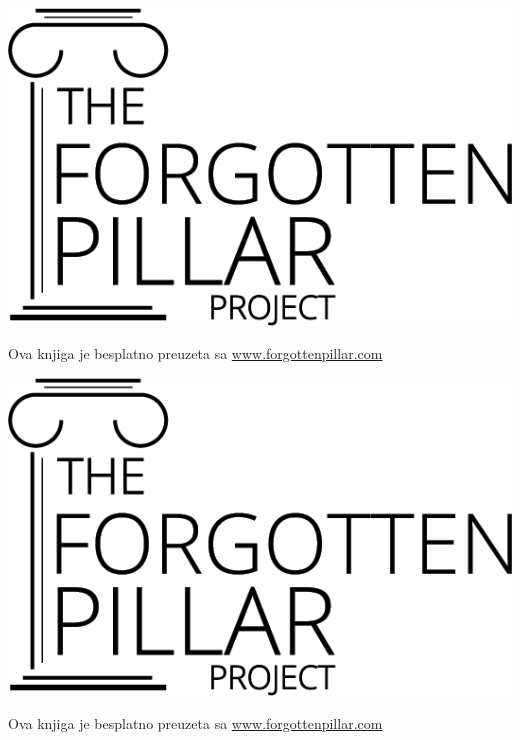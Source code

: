 {\ifepub
    \includegraphics[width=\linewidth]{images/logo-black.png}

    Ova knjiga je besplatno preuzeta sa \href{https://forgottenpillar.com/book/the-forgotten-pillar}{www.forgottenpillar.com}
\else
    \noindent
    \begin{minipage}{0.3\textwidth}
        \includegraphics[width=\linewidth]{images/logo-black.png}
    \end{minipage}%
    \hfill
    \begin{minipage}{\dimexpr\linewidth-0.3\textwidth-0.2\textwidth-1em\relax}
        \raggedleft\footnotesize
        Ova knjiga je besplatno preuzeta sa \href{https://forgottenpillar.com/book/the-forgotten-pillar}{www.forgottenpillar.com}
    \end{minipage}%
    \hfill
    \begin{minipage}{0.125\textwidth}
        \centering
    \end{minipage}
\fi
}

\pagebreak